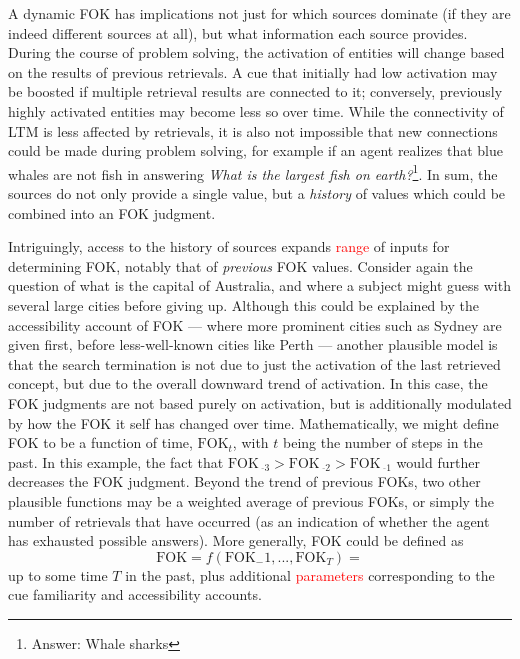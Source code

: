 \documentclass[10pt,letterpaper]{article}
\newcommand{\comment}[1]{}
\newcommand{\fixme}[2][]{#2}
\renewcommand{\fixme}[2][]{\textcolor{red}{#2}}
\newcommand{\negsub}[0]{\;\!^{\_}}
\newcommand{\fok}[0]{\text{FOK}}
\newcommand{\question}[2]{\textit{#1}\footnote{Answer: #2}}
\begin{document}
A dynamic FOK has implications not just for which sources dominate (if they are indeed different sources at all), but what information each source provides.
During the course of problem solving, the activation of entities will change based on the results of previous retrievals.
A cue that initially had low activation may be boosted if multiple retrieval results are connected to it; conversely, previously highly activated entities may become less so over time.
While the connectivity of LTM is less affected by retrievals, it is also not impossible that new connections could be made during problem solving, for example if an agent realizes that blue whales are not fish in answering \question{What is the largest fish on earth?}{Whale sharks}.
In sum, the sources do not only provide a single value, but a \textit{history} of values which could be combined into an FOK judgment.

Intriguingly, access to the history of sources expands \fixme{range} of inputs for determining FOK, notably that of \textit{previous} FOK values.
Consider again the question of what is the capital of Australia, and where a subject might guess with several large cities before giving up.
Although this could be explained by the accessibility account of FOK --- where more prominent cities such as Sydney are given first, before less-well-known cities like Perth --- another plausible model is that the search termination is not due to just the activation of the last retrieved concept, but due to the overall downward trend of activation.
In this case, the FOK judgments are not based purely on activation, but is additionally modulated by how the FOK it self has changed over time.
Mathematically, we might define FOK to be a function of time, $\fok_t$, with $t$ being the number of steps in the past.
In this example, the fact that $\fok_{{\negsub}3} > \fok_{{\negsub}2} > \fok_{{\negsub}1}$ would further decreases the FOK judgment.
Beyond the trend of previous FOKs, two other plausible functions may be a weighted average of previous FOKs, or simply the number of retrievals that have occurred (as an indication of whether the agent has exhausted possible answers).
More generally, FOK could be defined as
$$\fok = f(\fok_-1, ..., \fok_T) = $$
up to some time $T$ in the past, plus additional \fixme{parameters} corresponding to the cue familiarity and accessibility accounts.

\comment{
    mathematical pitfalls
        repeated retrievals will boost activation; 
    the impact of "unrelated" retrievals/inferences
    any modeling issues?
}
\end{document}
